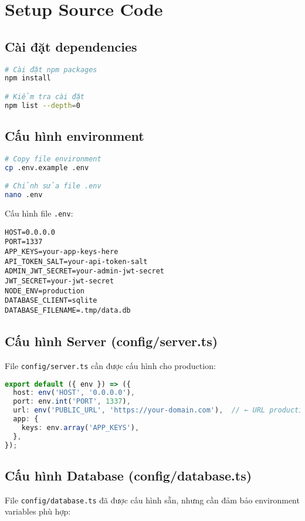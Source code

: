 \documentclass[12pt,a4paper]{article}
\begin{document}
\section{Setup Source Code}

\subsection{Cài đặt dependencies}
\begin{lstlisting}[language=bash]
# Cài đặt npm packages
npm install

# Kiểm tra cài đặt
npm list --depth=0
\end{lstlisting}

\subsection{Cấu hình environment}
\begin{lstlisting}[language=bash]
# Copy file environment
cp .env.example .env

# Chỉnh sửa file .env
nano .env
\end{lstlisting}

Cấu hình file \texttt{.env}:
\begin{lstlisting}[language=plaintext]
HOST=0.0.0.0
PORT=1337
APP_KEYS=your-app-keys-here
API_TOKEN_SALT=your-api-token-salt
ADMIN_JWT_SECRET=your-admin-jwt-secret
JWT_SECRET=your-jwt-secret
NODE_ENV=production
DATABASE_CLIENT=sqlite
DATABASE_FILENAME=.tmp/data.db
\end{lstlisting}

\subsection{Cấu hình Server (config/server.ts)}
File \texttt{config/server.ts} cần được cấu hình cho production:
\begin{lstlisting}[language=typescript]
export default ({ env }) => ({
  host: env('HOST', '0.0.0.0'),
  port: env.int('PORT', 1337),
  url: env('PUBLIC_URL', 'https://your-domain.com'),  // ← URL production
  app: {
    keys: env.array('APP_KEYS'),
  },
});
\end{lstlisting}

\subsection{Cấu hình Database (config/database.ts)}
File \texttt{config/database.ts} đã được cấu hình sẵn, nhưng cần đảm bảo environment variables phù hợp:
\end{document}
